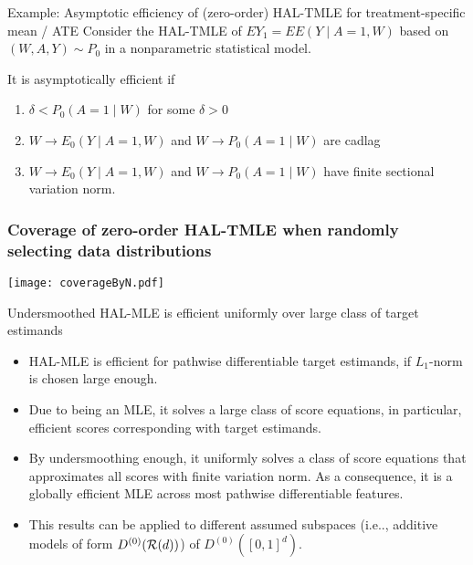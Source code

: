 \documentclass[t]{beamer}
\newlength{\wideitemsep}
\let\olditem\item
\renewcommand{\item}{\setlength{\itemsep}{\wideitemsep}\olditem}
\begin{document}
\begin{frame}{Example: Asymptotic  efficiency of (zero-order) HAL-TMLE for treatment-specific mean / ATE}
Consider the HAL-TMLE of $EY_1=EE(Y\mid A=1,W)$ based on $(W,A,Y)\sim P_0$ in a nonparametric statistical model.

\vspace{.15in}

It is asymptotically efficient if
\begin{enumerate}
\item $\delta<P_0(A=1\mid W)$ for some $\delta>0$
\item $W\rightarrow E_0(Y\mid A=1,W)$  and $W\rightarrow P_0(A=1\mid W)$ are cadlag
\item $W\rightarrow E_0(Y\mid A=1,W)$  and $W\rightarrow P_0(A=1\mid W)$ have finite sectional variation norm.
\end{enumerate}
\end{frame}

\begin{frame}
\frametitle{Coverage of zero-order HAL-TMLE when randomly selecting data distributions}
\vspace{-15pt}
\begin{center}
\texttt{[image: coverageByN.pdf]}
\end{center}
\end{frame}

\begin{frame}{Undersmoothed HAL-MLE   is efficient uniformly over large class of target estimands}
\begin{itemize}
\item HAL-MLE is efficient for pathwise differentiable target estimands, if $L_1$-norm is chosen large enough.
\item Due to being an MLE, it solves a large class of score equations, in particular, efficient scores corresponding with target estimands.
\item By undersmoothing enough, it uniformly solves a class of score equations that approximates all scores with finite variation norm. As a consequence, it is a globally efficient MLE across most pathwise differentiable features.
\item This results can be applied to different assumed subspaces (i.e.., additive models of form $D^{(0)}({\cal R}(d))$) of $D^{(0)}([0,1]^d)$.
\end{itemize}
\end{frame}
\end{document}
